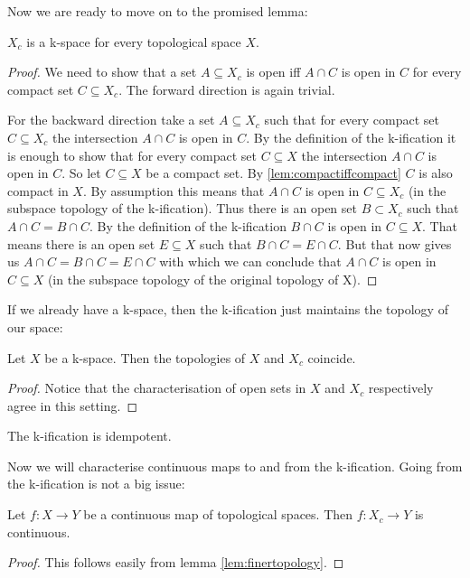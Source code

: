 Now we are ready to move on to the promised lemma:

\begin{lem}
    $X_c$ is a k-space for every topological space $X$.
\end{lem}
\begin{proof}
    We need to show that a set $A \subseteq X_c$ is open iff $A \cap C$ is open in $C$ for every compact set $C \subseteq X_c$. The forward direction is again trivial. 
    
    For the backward direction take a set $A \subseteq X_c$ such that for every compact set $C \subseteq X_c$ the intersection $A \cap C$ is open in $C$. 
    By the definition of the k-ification it is enough to show that for every compact set $C \subseteq X$ the intersection $A \cap C$ is open in $C$. So let $C \subseteq X$ be a compact set. 
    By \ref{lem:compactiffcompact} $C$ is also compact in $X$.
    By assumption this means that $A \cap C$ is open in $C \subseteq X_c$ (in the subspace topology of the k-ification). Thus there is an open set $B \subset X_c$ such that $A \cap C = B \cap C$. 
    By the definition of the k-ification $B \cap C$ is open in $C \subseteq X$. 
    That means there is an open set $E \subseteq X$ such that $B \cap C = E \cap C$. 
    But that now gives us $A \cap C = B \cap C = E \cap C$ with which we can conclude that $A \cap C$ is open in $C \subseteq X$ (in the subspace topology of the original topology of X).
\end{proof}

If we already have a k-space, then the k-ification just maintains the topology of our space:

\begin{lem}\label{lem:kificationkspace}
    Let $X$ be a k-space.
    Then the topologies of $X$ and $X_c$ coincide.
\end{lem}
\begin{proof}
    Notice that the characterisation of open sets in $X$ and $X_c$ respectively agree in this setting.
\end{proof}

\begin{cor}
    The k-ification is idempotent.
\end{cor}

Now we will characterise continuous maps to and from the k-ification. 
Going from the k-ification is not a big issue: 

\begin{lem}\label{lem:continuousfromkification}
    Let $f \colon X \to Y$ be a continuous map of topological spaces.
    Then $f \colon X_c \to Y$ is continuous.
\end{lem}
\begin{proof}
    This follows easily from lemma \ref{lem:finertopology}.
\end{proof}

